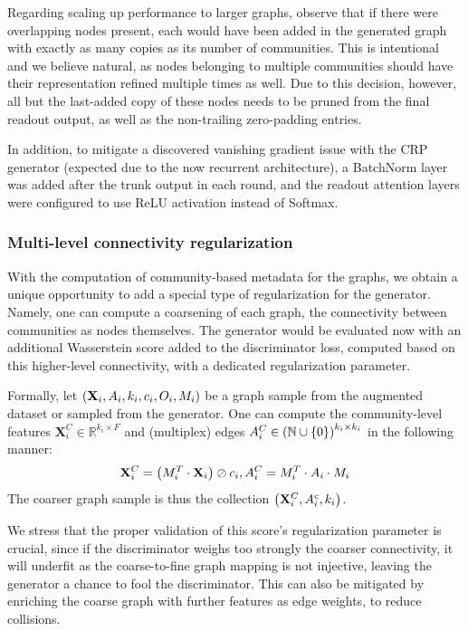 Regarding scaling up performance to larger graphs, observe that if there were overlapping nodes present, each would have been added in the generated graph with exactly as many copies as its number of communities. This is intentional and we believe natural, as nodes belonging to multiple communities should have their representation refined multiple times as well. Due to this decision, however, all but the last-added copy of these nodes needs to be pruned from the final readout output, as well as the non-trailing zero-padding entries.

In addition, to mitigate a discovered vanishing gradient issue with the CRP generator (expected due to the now recurrent architecture), a BatchNorm layer was added after the trunk output in each round, and the readout attention layers were configured to use ReLU activation instead of Softmax.

\subsubsection{Multi-level connectivity regularization}
With the computation of community-based metadata for the graphs, we obtain a unique opportunity to add a special type of regularization for the generator. Namely, one can compute a coarsening of each graph, the connectivity between communities as nodes themselves. The generator would be evaluated now with an additional Wasserstein score added to the discriminator loss, computed based on this higher-level connectivity, with a dedicated regularization parameter. 

Formally, let $\mathopen{}\left(\mathbf{X}_i, A_i, k_i, c_i, O_i, M_i\right)$ be a graph sample from the augmented dataset or sampled from the generator. One can compute the community-level features $\mathbf{X}^C_i \in \mathbb{R}^{k_i \times F}$ and (multiplex) edges $A^C_i \in \mathopen{}\left(\mathbb{N} \cup \mathopen{}\left\{0\right\}\right)^{k_i \times k_i}$ in the following manner: 
\begin{equation}
\mathbf{X}^C_i = \mathopen{}\left(M^T_i \cdot \mathbf{X}_i\right) \oslash c_i, A^C_i = M^T_i \cdot A_i \cdot M_i    
\end{equation}
The coarser graph sample is thus the collection $\mathopen{}\left(\mathbf{X}^C_i, A^c_i, k_i\right)$.

We stress that the proper validation of this score's regularization parameter is crucial, since if the discriminator weighs too strongly the coarser connectivity, it will underfit as the coarse-to-fine graph mapping is not injective, leaving the generator a chance to fool the discriminator. This can also be mitigated by enriching the coarse graph with further features as edge weights, to reduce collisions.

